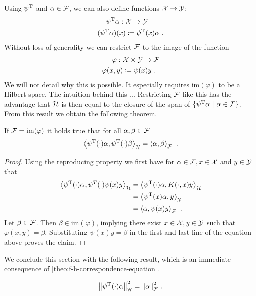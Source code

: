 Using $\psi^{\mathrm{T}}$ and $\alpha \in \mathcal{F}$, we can also define functions $\mathcal{X} \rightarrow \mathcal{Y}$:
\begin{align}
		\psi^{\mathrm{T}}\alpha: ~&\mathcal{X} \rightarrow \mathcal{Y} \\
		(\psi^{\mathrm{T}}\alpha)(x) &\coloneqq \psi^{\mathrm{T}}(x)\alpha \ .
\end{align}
Without loss of generality we can restrict $\mathcal{F}$ to the image of the function
\begin{align}
	\varphi: ~&\mathcal{X} \times \mathcal{Y} \rightarrow \mathcal{F}\\
	\varphi(x, y) &\coloneqq \psi(x)y\ .
\end{align}
We will not detail why this is possible.
It especially requires $\mathrm{im}(\varphi)$ to be a Hilbert space.
The intuition behind this ...
Restricting $\mathcal{F}$ like this has the advantage that $\mathcal{H}$ is then equal to the closure of the span of $\{\psi^{\mathrm{T}}\alpha\ |\ \alpha \in \mathcal{F}\}$.
From this result we obtain the following theorem.
\begin{theorem}
	\label{theo:f-h-correspondence-equation}
	If $\mathcal{F} = \mathrm{im}(\varphi)$ it holds true that for all $\alpha, \beta \in \mathcal{F}$ 
	\begin{equation}
		\left< \psi^{\mathrm{T}}(\cdot) \alpha, \psi^{\mathrm{T}}(\cdot) \beta\right>_{\mathcal{H}} = \left< \alpha, \beta\right>_{\mathcal{F}} \ .
	\end{equation}
\end{theorem}
\begin{proof}
	Using the reproducing property we first have for $\alpha \in \mathcal{F}, x \in \mathcal{X}$ and $y \in \mathcal{Y}$ that
	\begin{align}
		\left<\psi^{\mathrm{T}}(\cdot) \alpha, \psi^T(\cdot)\psi(x)y\right>_{\mathcal{H}}
		&= \left<\psi^{\mathrm{T}}(\cdot) \alpha, K(\cdot, x) y \right>_{\mathcal{H}} \\
		&= \left<\psi^{\mathrm{T}}(x)\alpha, y\right>_{\mathcal{Y}}\\
		&= \left<\alpha, \psi(x)y\right>_{\mathcal{F}} \ .
	\end{align}
	Let $\beta \in \mathcal{F}$.
	Then $\beta \in \mathrm{im}(\varphi)$, implying there exist $x \in \mathcal{X}, y \in \mathcal{Y}$ such that $\varphi(x, y) = \beta$.
	Substituting $\psi(x)y = \beta$ in the first and last line of the equation above proves the claim.
\end{proof}
We conclude this section with the following result, which is an immediate consequence of \cref{theo:f-h-correspondence-equation}.
\begin{corollary}
	\label{cor:feature-space-norm}
	\begin{equation}
		\norm{\psi^{\mathrm{T}}(\cdot)\alpha}_{\mathcal{H}}^2 = \norm{\alpha}_{\mathcal{F}}^2 \ .
	\end{equation}
\end{corollary}
